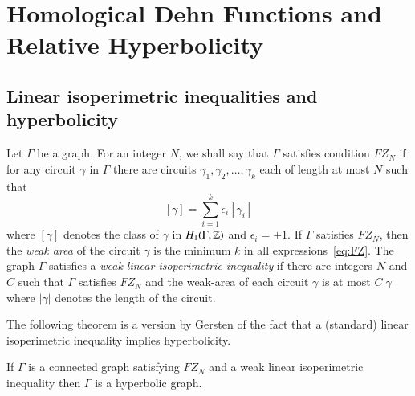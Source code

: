 \section{Homological Dehn Functions and Relative Hyperbolicity}




\subsection{Linear isoperimetric inequalities and hyperbolicity}

 
 \begin{definition}\cite[Def. 6.1]{Ge96}\label{def:Gersten}
Let $\Gamma$ be a graph. For an  integer $N$, we shall say that $\Gamma$ satisfies condition   $FZ_N$ if for any circuit $\gamma$ in $\Gamma$ there are circuits $\gamma_1, \gamma_2, \ldots , \gamma_k$ each of length at most $N$ such that 
\begin{equation}\label{eq:FZ}  [\gamma] =  \sum_{i=1}^k \epsilon_i [\gamma_i] \end{equation}
where $[\gamma]$ denotes the class of $\gamma$ in $H_1 (\Gamma, \mathbb{Z})$ and $\epsilon_i=\pm 1$.  If $\Gamma$ satisfies $FZ_N$, then the \emph{weak area} of the circuit $\gamma$ is the minimum $k$ in all expressions~\eqref{eq:FZ}.  The graph $\Gamma$ satisfies a \emph{weak linear isoperimetric inequality} if there are   integers $N$ and $C$ such that $\Gamma$ satisfies $FZ_N$ and the weak-area of each circuit $\gamma$ is at most $C |\gamma|$ where $|\gamma|$ denotes the length of the circuit.
\end{definition}

The following theorem is a  version by Gersten of the fact that a (standard) linear isoperimetric inequality implies hyperbolicity.  

\begin{theorem}\cite[Thm. 6.3]{Ge96}\label{thm:weak-isop}
If $\Gamma$ is a connected graph satisfying $FZ_N$ and a weak linear isoperimetric inequality then $\Gamma$ is a hyperbolic graph.
\end{theorem}

